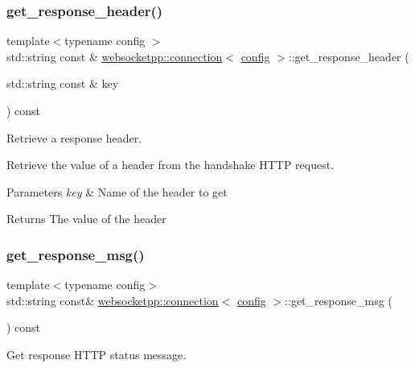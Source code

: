 \subsubsection{\texorpdfstring{get\+\_\+response\+\_\+header()}{get\_response\_header()}}
{\footnotesize\ttfamily template$<$typename config $>$ \\
std\+::string const  \& \mbox{\hyperlink{classwebsocketpp_1_1connection}{websocketpp\+::connection}}$<$ \mbox{\hyperlink{classconfig}{config}} $>$\+::get\+\_\+response\+\_\+header (\begin{DoxyParamCaption}\item[{std\+::string const \&}]{key }\end{DoxyParamCaption}) const}



Retrieve a response header. 

Retrieve the value of a header from the handshake H\+T\+TP request.


\begin{DoxyParams}{Parameters}
{\em key} & Name of the header to get \\
\hline
\end{DoxyParams}
\begin{DoxyReturn}{Returns}
The value of the header 
\end{DoxyReturn}
\mbox{\label{classwebsocketpp_1_1connection_a9fd34116c40027378b0040b4076503eb}} 
\subsubsection{\texorpdfstring{get\+\_\+response\+\_\+msg()}{get\_response\_msg()}}
{\footnotesize\ttfamily template$<$typename config$>$ \\
std\+::string const\& \mbox{\hyperlink{classwebsocketpp_1_1connection}{websocketpp\+::connection}}$<$ \mbox{\hyperlink{classconfig}{config}} $>$\+::get\+\_\+response\+\_\+msg (\begin{DoxyParamCaption}{ }\end{DoxyParamCaption}) const\hspace{0.3cm}{\ttfamily [inline]}}



Get response H\+T\+TP status message. 


